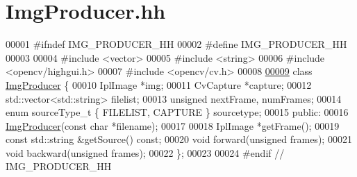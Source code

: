 \hypertarget{ImgProducer_8hh_source}{
\section{ImgProducer.hh}
}

\begin{DoxyCode}
00001 \textcolor{preprocessor}{#ifndef IMG\_PRODUCER\_HH}
00002 \textcolor{preprocessor}{}\textcolor{preprocessor}{#define IMG\_PRODUCER\_HH}
00003 \textcolor{preprocessor}{}
00004 \textcolor{preprocessor}{#include <vector>}
00005 \textcolor{preprocessor}{#include <string>}
00006 \textcolor{preprocessor}{#include <opencv/highgui.h>}
00007 \textcolor{preprocessor}{#include <opencv/cv.h>}
00008 
\hypertarget{ImgProducer_8hh_source_l00009}{}\hyperlink{classImgProducer}{00009} \textcolor{keyword}{class }\hyperlink{classImgProducer}{ImgProducer} \{
00010      IplImage *img;
00011      CvCapture *capture;
00012      std::vector<std::string> filelist;
00013      \textcolor{keywordtype}{unsigned} nextFrame, numFrames;
00014      \textcolor{keyword}{enum} sourceType\_t \{ FILELIST, CAPTURE \} sourcetype;
00015 \textcolor{keyword}{public}:
00016      \hyperlink{classImgProducer}{ImgProducer}(\textcolor{keyword}{const} \textcolor{keywordtype}{char} *filename);
00017 
00018      IplImage *getFrame();
00019      \textcolor{keyword}{const} std::string &getSource() \textcolor{keyword}{const};
00020      \textcolor{keywordtype}{void} forward(\textcolor{keywordtype}{unsigned} frames);
00021      \textcolor{keywordtype}{void} backward(\textcolor{keywordtype}{unsigned} frames);
00022 \};
00023 
00024 \textcolor{preprocessor}{#endif  // IMG\_PRODUCER\_HH}
\end{DoxyCode}
